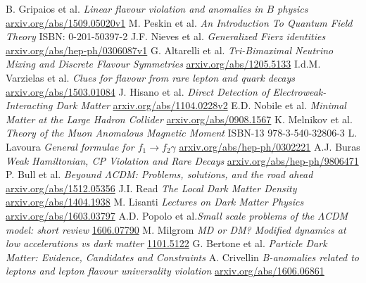 \begin{thebibliography}{xxx}
 B. Gripaios et al. \textit{Linear flavour violation and anomalies in $B$ physics} \href{http://arxiv.org/abs/1509.05020v1}{arxiv.org/abs/1509.05020v1}
 M. Peskin et al. \textit{An Introduction To Quantum Field Theory} ISBN: 0-201-50397-2
 J.F. Nieves et al. \textit{Generalized Fierz identities} \href{http://arxiv.org/abs/hep-ph/0306087v1}{arxiv.org/abs/hep-ph/0306087v1}
 G. Altarelli et al. \textit{Tri-Bimaximal Neutrino Mixing and Discrete Flavour Symmetries} \href{https://arxiv.org/abs/1205.5133}{arxiv.org/abs/1205.5133}
 I.d.M. Varzielas et al. \textit{Clues for flavour from rare lepton and quark decays} \href{https://arxiv.org/abs/1503.01084}{arxiv.org/abs/1503.01084}
 J. Hisano et al. \textit{Direct Detection of Electroweak-Interacting Dark Matter} \href{https://arxiv.org/abs/1104.0228v2}{arxiv.org/abs/1104.0228v2}
 E.D. Nobile et al. \textit{Minimal Matter at the Large Hadron Collider} \href{http://arxiv.org/abs/0908.1567}{arxiv.org/abs/0908.1567}
 K. Melnikov et al. \textit{Theory of the Muon Anomalous Magnetic Moment} ISBN-13 978-3-540-32806-3
 L. Lavoura \textit{General formulae for $f_1\rightarrow f_2 \gamma$} \href{http://arxiv.org/abs/hep-ph/0302221}{arxiv.org/abs/hep-ph/0302221}
 A.J. Buras \textit{Weak Hamiltonian, CP Violation and Rare Decays} \href{http://arxiv.org/abs/hep-ph/9806471}{arxiv.org/abs/hep-ph/9806471}
 P. Bull et al. \textit{Beyound $\Lambda$CDM: Problems, solutions, and the road ahead} \href{http://arxiv.org/abs/1512.05356}{arxiv.org/abs/1512.05356}
 J.I. Read \textit{The Local Dark Matter Density} \href{http://arxiv.org/abs/1404.1938}{arxiv.org/abs/1404.1938}
 M. Lisanti \textit{Lectures on Dark Matter Physics} \href{https://arxiv.org/abs/1603.03797}{arxiv.org/abs/1603.03797}
 A.D. Popolo et al.\textit{Small scale problems of the $\Lambda$CDM model: short review} \href{https://arxiv.org/abs/1606.07790}{1606.07790}
 M. Milgrom \textit{MD or DM? Modified dynamics at low accelerations vs dark matter} \href{https://arxiv.org/abs/1101.5122}{1101.5122}
 G. Bertone et al. \textit{Particle Dark Matter: Evidence, Candidates and Constraints} 
 A. Crivellin \textit{B-anomalies related to leptons and lepton flavour universality violation} \href{https://arxiv.org/abs/1606.06861}{arxiv.org/abs/1606.06861}

\end{thebibliography}
